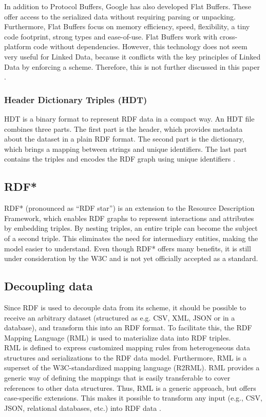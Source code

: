 \noindent In addition to Protocol Buffers, Google has also developed Flat Buffers. These offer access to the serialized data without requiring parsing or unpacking. Furthermore, Flat Buffers focus on memory efficiency, speed, flexibility, a tiny code footprint, strong types and ease-of-use. Flat Buffers work with cross-platform code without dependencies. However, this technology does not seem very useful for Linked Data, because it conflicts with the key principles of Linked Data by enforcing a scheme. Therefore, this is not further discussed in this paper \cite{flatbuf}.

\subsubsection{Header Dictionary Triples (HDT)}\label{sssec:formatting-hdt}
HDT is a binary format to represent RDF data in a compact way. An HDT file combines three parts. The first part is the header, which provides metadata about the dataset in a plain RDF format. The second part is the dictionary, which brings a mapping between strings and unique identifiers. The last part contains the triples and encodes the RDF graph using unique identifiers \cite{hdt}.

\subsection{RDF*}
RDF* (pronounced as ``RDF star'') is an extension to the Resource Description Framework, which enables RDF graphs to represent interactions and attributes by embedding triples. By nesting triples, an entire triple can become the subject of a second triple. This eliminates the need for intermediary entities, making the model easier to understand. Even though RDF* offers many benefits, it is still under consideration by the W3C and is not yet officially accepted as a standard.

\subsection{Decoupling data}\label{formatting-decoupling}
Since RDF is used to decouple data from its scheme, it should be possible to receive an arbitrary dataset (structured as e.g. CSV, XML, JSON or in a database), and transform this into an RDF format. To facilitate this, the RDF Mapping Language (RML) is used to materialize data into RDF triples.\\

\noindent RML is defined to express customized mapping rules from heterogeneous data structures and serializations to the RDF data model. Furthermore, RML is a superset of the W3C-standardized mapping language (R2RML). RML provides a generic way of defining the mappings that is easily transferable to cover references to other data structures. Thus, RML is a generic approach, but offers case-specific extensions. This makes it possible to transform any input (e.g., CSV, JSON, relational databases, etc.) into RDF data \cite{dimou2014rml}.
